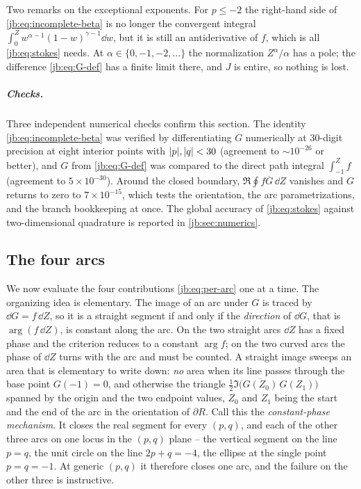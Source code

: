 Two remarks on the exceptional exponents.
For $p \le -2$ the right-hand side of \eqref{jb:eq:incomplete-beta} is no longer the convergent integral
$\int_0^Z w^{\alpha - 1} (1 - w)^{\gamma - 1} \dd w$, but it is still an antiderivative of $f$, which
is all \eqref{jb:eq:stokes} needs.
At $\alpha \in \{0, -1, -2, \dots\}$ the normalization $Z^\alpha / \alpha$ has a pole; the difference
\eqref{jb:eq:G-def} has a finite limit there, and $J$ is entire, so nothing is lost.

\subparagraph{Checks.}
Three independent numerical checks confirm this section.
The identity \eqref{jb:eq:incomplete-beta} was verified by differentiating $G$ numerically at $30$-digit
precision at eight interior points with ${|p|}, {|q|} < 30$ (agreement to $\sim 10^{-26}$ or
better), and $G$ from \eqref{jb:eq:G-def} was compared to the direct path integral $\int_{-1}^Z f$
(agreement to $5 \times 10^{-30}$).
Around the closed boundary, $\Re \oint f \overline{G} \, \dd Z$ vanishes and $G$ returns to zero to
$7 \times 10^{-15}$, which tests the orientation, the arc parametrizations, and the branch
bookkeeping at once.
The global accuracy of \eqref{jb:eq:stokes} against two-dimensional quadrature is reported in
\cref{jb:sec:numerics}.


\subsection{The four arcs}
\label{jb:sec:arcs}


We now evaluate the four contributions \eqref{jb:eq:per-arc} one at a time.
The organizing idea is elementary.
The image of an arc under $G$ is traced by $\dd G = f \, \dd Z$, so it is a straight segment if
and only if the \emph{direction} of $\dd G$, that is $\arg(f \, \dd Z)$, is constant along the arc.
On the two straight arcs $\dd Z$ has a fixed phase and the criterion reduces to a constant
$\arg f$; on the two curved arcs the phase of $\dd Z$ turns with the arc and must be counted.
A straight image sweeps an area that is elementary to write down: \emph{no} area when its line
passes through the base point $G(-1) = 0$, and otherwise the triangle
$\tfrac12 \Im \bigl( \overline{G(Z_0)} \, G(Z_1) \bigr)$ spanned by the origin and the two
endpoint values, $Z_0$ and $Z_1$ being the start and the end of the arc in the orientation of
$\partial R$.
Call this the \emph{constant-phase mechanism}.
It closes the real segment for every $(p, q)$, and each of the other three arcs on one locus in the
$(p, q)$ plane -- the vertical segment on the line $p = q$, the unit circle on the line
$2 p + q = -4$, the ellipse at the single point $p = q = -1$.
At generic $(p, q)$ it therefore closes one arc, and the failure on the other three is instructive.


